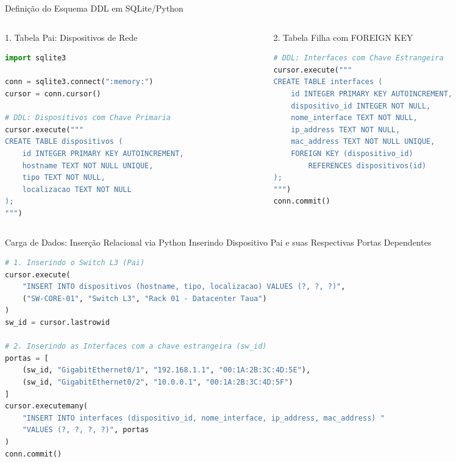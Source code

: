 \begin{frame}[fragile]{Definição do Esquema DDL em SQLite/Python}
  \vspace{-0.2cm}
  \begin{columns}[t]
    \begin{column}{0.48\textwidth}
      \alert{1. Tabela Pai: Dispositivos de Rede}\par
      \begin{lstlisting}[language=Python,basicstyle=\ttfamily\tiny]
import sqlite3

conn = sqlite3.connect(":memory:")
cursor = conn.cursor()

# DDL: Dispositivos com Chave Primaria
cursor.execute("""
CREATE TABLE dispositivos (
    id INTEGER PRIMARY KEY AUTOINCREMENT,
    hostname TEXT NOT NULL UNIQUE,
    tipo TEXT NOT NULL,
    localizacao TEXT NOT NULL
);
""")
      \end{lstlisting}
    \end{column}

    \begin{column}{0.48\textwidth}
      \alert{2. Tabela Filha com FOREIGN KEY}\par
      \begin{lstlisting}[language=Python,basicstyle=\ttfamily\tiny]
# DDL: Interfaces com Chave Estrangeira
cursor.execute("""
CREATE TABLE interfaces (
    id INTEGER PRIMARY KEY AUTOINCREMENT,
    dispositivo_id INTEGER NOT NULL,
    nome_interface TEXT NOT NULL,
    ip_address TEXT NOT NULL,
    mac_address TEXT NOT NULL UNIQUE,
    FOREIGN KEY (dispositivo_id) 
        REFERENCES dispositivos(id)
);
""")
conn.commit()
      \end{lstlisting}
    \end{column}
  \end{columns}
\end{frame}

\begin{frame}[fragile]{Carga de Dados: Inserção Relacional via Python}
  \vspace{-0.2cm}
  \alert{Inserindo Dispositivo Pai e suas Respectivas Portas Dependentes}\par
  \begin{lstlisting}[language=Python,basicstyle=\ttfamily\tiny]
# 1. Inserindo o Switch L3 (Pai)
cursor.execute(
    "INSERT INTO dispositivos (hostname, tipo, localizacao) VALUES (?, ?, ?)",
    ("SW-CORE-01", "Switch L3", "Rack 01 - Datacenter Taua")
)
sw_id = cursor.lastrowid

# 2. Inserindo as Interfaces com a chave estrangeira (sw_id)
portas = [
    (sw_id, "GigabitEthernet0/1", "192.168.1.1", "00:1A:2B:3C:4D:5E"),
    (sw_id, "GigabitEthernet0/2", "10.0.0.1", "00:1A:2B:3C:4D:5F")
]
cursor.executemany(
    "INSERT INTO interfaces (dispositivo_id, nome_interface, ip_address, mac_address) "
    "VALUES (?, ?, ?, ?)", portas
)
conn.commit()
  \end{lstlisting}
\end{frame}

